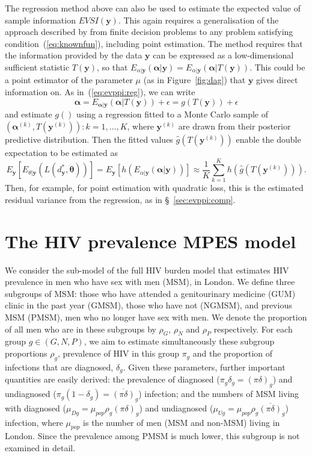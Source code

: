 \documentclass[12pt]{article}\usepackage[]{graphicx}\usepackage[]{color}
\newcommand{\y}{\mathbf{y}}
\newcommand{\pinodelta}{\overline{(\pi\delta)}}
\newcommand{\pidelta}{(\pi\delta)}
\begin{document}
The regression method above can also be used to estimate the expected value of sample information $EVSI(\y)$.   This again requires a generalisation of the approach described by \citet{strong:oakley:evsi} from finite decision problems to any problem satisfying condition~(\ref{eq:knownfun}), including point estimation.  The method requires that the information provided by the data $\y$ can be expressed as a low-dimensional sufficient statistic $T(\y)$, so that $E_{\alpha|\y}(\bm\alpha | \y) = E_{\alpha|\y}(\bm\alpha | T(\y))$.  This could be a point estimator of the parameter $\mu$ (as in Figure~\ref{fig:dag}) that $\y$ gives direct information on.  As in~(\ref{eq:evppi:reg}), we can write
\[
\bm\alpha  =  E_{\bm\alpha|\y}(\bm\alpha|T(\y)) + \epsilon  =  g(T(\y)) + \epsilon
\]
and estimate $g()$ using a regression fitted to a Monte Carlo sample of $(\bm\alpha^{(k)}, T(\y^{(k)})): k=1,\ldots,K$, where $\y^{(k)}$ are drawn from their posterior predictive distribution.  Then the fitted values $\hat g(T(\y^{(k)}))$ enable the double expectation to be estimated as
\[
E_{\y} [  E_{\theta|\y} (L(d^*_{\y},\bm\theta)) ] = E_{\y} [  h (E_{\alpha|\y}(\bm\alpha|\y)) ] \approx \frac{1}{K}\sum_{k=1}^K h(\hat g(T(\y^{(k)}))).
\]
Then, for example, for point estimation with quadratic loss, this is the estimated residual variance from the regression, as in \S~\ref{sec:evppi:comp}.



\section{The HIV prevalence MPES model}
\label{sec:hiv}

We consider the sub-model of the full HIV burden model \citep{DeAngelis2014a,PHEreport2016} that estimates HIV prevalence in men who have sex with men (MSM), in London.  We define three subgroups of MSM: those who have attended a genitourinary medicine (GUM) clinic in the past year (GMSM), those who have not (NGMSM), and previous MSM (PMSM), men who no longer have sex with men.  We denote the proportion of all men who are in these subgroups by $\rho_G$, $\rho_N$ and $\rho_P$ respectively.    For each group $g \in (G,N,P)$, we aim to estimate simultaneously these subgroup proportions $\rho_g$, prevalence of HIV in this group $\pi_g$ and the proportion of infections that are diagnosed, $\delta_g$. Given these parameters, further important quantities are easily derived: the prevalence of diagnosed ($\pi_g\delta_g = \pidelta_g$) and undiagnosed ($\pi_g(1-\delta_g) = \pinodelta_g$) infection; and the numbers of MSM living with diagnosed ($\mu_{Dg} = \mu_{pop}\rho_g\pidelta_g$) and undiagnosed ($\mu_{Ug} = \mu_{pop}\rho_g\pinodelta_g$) infection, where $\mu_{pop}$ is the number of men (MSM and non-MSM) living in London.    Since the prevalence among PMSM is much lower, this subgroup is not examined in detail.
\end{document}
